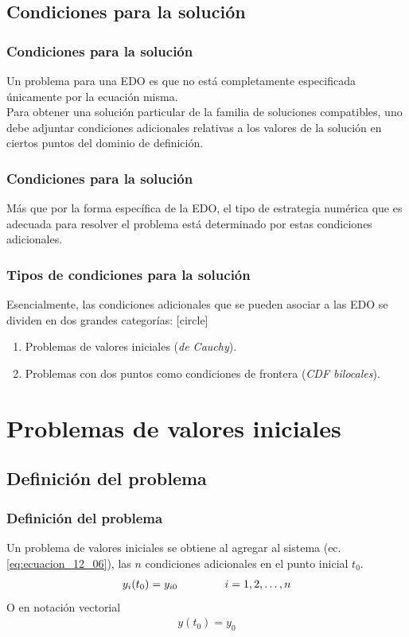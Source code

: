 \subsection*{Condiciones para la solución}
\begin{frame}
\frametitle{Condiciones para la solución}
Un problema para una EDO es que no está completamente especificada únicamente por la ecuación misma.
\\
\bigskip
\pause
Para obtener una solución particular de la familia de soluciones compatibles, uno debe adjuntar condiciones adicionales relativas a los valores de la solución en ciertos puntos del dominio de definición.
\end{frame}
\begin{frame}
\frametitle{Condiciones para la solución}
Más que por la forma específica de la EDO, el tipo de estrategia numérica que es adecuada para resolver el problema está determinado por estas condiciones adicionales.
\end{frame}
\begin{frame}
\frametitle{Tipos de condiciones para la solución}
Esencialmente, las condiciones adicionales que se pueden asociar a las EDO se dividen en dos grandes categorías:
[circle]
\begin{enumerate}[<+->]
\item Problemas de valores iniciales (\emph{de Cauchy}).
\item Problemas con dos puntos como condiciones de frontera (\emph{CDF bilocales}).
\end{enumerate}
\end{frame}
\section{Problemas de valores iniciales}
\subsection{Definición del problema}
\begin{frame}
\frametitle{Definición del problema}
Un problema de valores iniciales se obtiene al agregar al sistema (ec. \ref{eq:ecuacion_12_06}), las $n$ condiciones adicionales en el punto inicial $t_{0}$.
\begin{align}
y_{i} (t_{0}) = y_{i0} \hspace{1.5cm} i = 1, 2, \ldots, n
\label{eq:ecuacion_12_07}
\end{align}
\pause
O en notación vectorial
\begin{align}
y(t_{0}) = y_{0}
\label{eq:ecuacion_12_08}
\end{align}
\end{frame}
